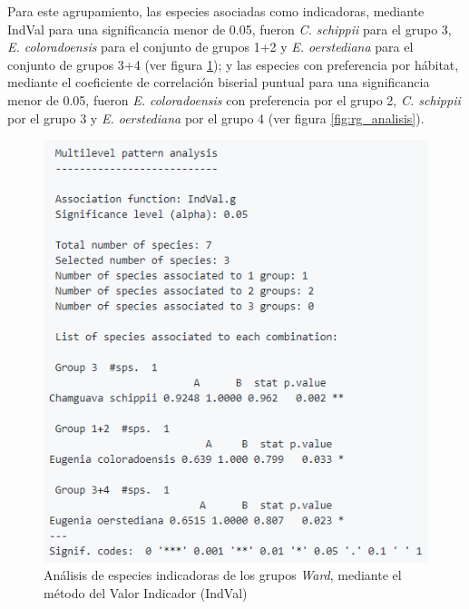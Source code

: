 \documentclass[11pt,]{article}
\begin{document}
Para este agrupamiento, las especies asociadas como indicadoras,
mediante IndVal para una significancia menor de 0.05, fueron \emph{C.
schippii} para el grupo 3, \emph{E. coloradoensis} para el conjunto de
grupos 1+2 y \emph{E. oerstediana} para el conjunto de grupos 3+4 (ver
figura \ref{fig:indval_analisis}); y las especies con preferencia por
hábitat, mediante el coeficiente de correlación biserial puntual para
una significancia menor de 0.05, fueron \emph{E. coloradoensis} con
preferencia por el grupo 2, \emph{C. schippii} por el grupo 3 y \emph{E.
oerstediana} por el grupo 4 (ver figura \ref{fig:rg_analisis}).

\begin{figure}
\centering
\includegraphics{inval_analisis.png}
\caption{Análisis de especies indicadoras de los grupos \emph{Ward},
mediante el método del Valor Indicador (IndVal)
\label{fig:indval_analisis}}
\end{figure}
\end{document}
